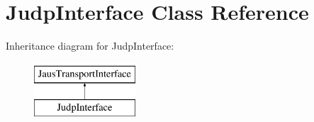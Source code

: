 \hypertarget{class_judp_interface}{\section{\-Judp\-Interface \-Class \-Reference}
\label{class_judp_interface}
}
\-Inheritance diagram for \-Judp\-Interface\-:\begin{figure}[H]
\begin{center}
\leavevmode
\includegraphics[height=2.000000cm]{class_judp_interface}
\end{center}
\end{figure}
